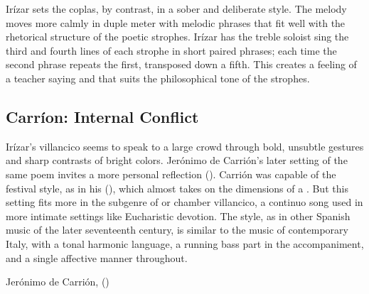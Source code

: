 Irízar sets the coplas, by contrast, in a sober and deliberate style.
The melody moves more calmly in duple meter with melodic phrases that fit well
with the rhetorical structure of the poetic strophes.  
Irízar has the treble soloist sing the third and fourth lines of each strophe in
short paired phrases; each time the second phrase repeats the first, transposed
down a fifth.
This creates a feeling of a teacher saying  and
 that suits the philosophical tone of the strophes.

\subsection{Carríon: Internal Conflict}

Irízar's villancico seems to speak to a large crowd through bold, unsubtle
gestures and sharp contrasts of bright colors.
Jerónimo de Carrión's later setting of the same poem invites a more personal
reflection ().%
    \Autocite[149--152]{Cashner:WLSCM32}
Carrión was capable of the festival style, as in his  (), which almost takes on the dimensions of a
.  
But this setting fits more in the subgenre of  or chamber
villancico, a continuo song used in more intimate settings like Eucharistic
devotion.%
    \Autocite[See, for example][]{Robledo:MadridTonos}
The style, as in other Spanish music of the later seventeenth century, is
similar to the  music of contemporary Italy, with a tonal
harmonic language, a running bass part in the accompaniment, and a single
affective manner throughout.


{Jerónimo de Carrión, 
()}

